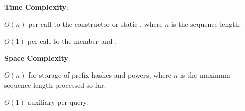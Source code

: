 \textbf{Time Complexity}:
\begin{compactitem}
  \item $O(n)$ per call to the constructor or static , where $n$ is the sequence length.
  \item $O(1)$ per call to the member  and .
\end{compactitem}

\textbf{Space Complexity}:
\begin{compactitem}
  \item $O(n)$ for storage of prefix hashes and powers, where $n$ is the maximum sequence length processed so far.
  \item $O(1)$ auxiliary per query.
\end{compactitem}

